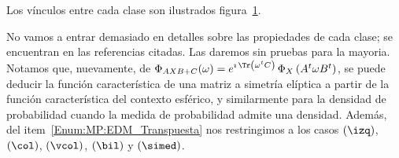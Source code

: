 %
Los v\'inculos entre cada clase son ilustrados figura~\ref{Fig:MP:EDMatrix}.
%
%
\begin{figure}[h!]
\begin{center}  \end{center}
% 
\label{Fig:MP:EDMatrix}
\end{figure}


No vamos a entrar demasiado en  detalles sobre las propiedades de cada clase; se
encuentran en las referencias citadas.  Las daremos sin pruebas para la mayoria.
Notamos que, nuevamente,  de $\Phi_{A X B + C}(\omega)  = e^{\imath \, \Tr\left(
    \omega^t  C \right)}  \,  \Phi_X\left(  A^t \omega  B^t  \right)$, se  puede
deducir la  funci\'on caracter\'istica de  una matriz a simetr\'ia  el\'iptica a
partir de la funci\'on  caracter\'istica del contexto esf\'erico, y similarmente
para la  densidad de  probabilidad cuando la  medida de probabilidad  admite una
densidad.  Adem\'as,  del item~\ref{Enum:MP:EDM_Transpuesta} nos  restringimos a
los casos $(\izq)$, $(\col)$, $(\vcol)$, $(\bil)$ y $(\simed)$.

